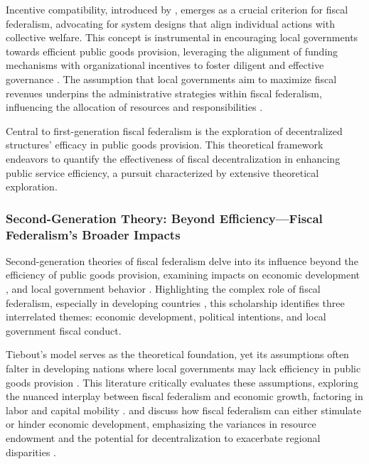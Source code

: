 Incentive compatibility, introduced by \textcite{hurwicz1973design}, emerges as a crucial criterion for fiscal federalism, advocating for system designs that align individual actions with collective welfare. This concept is instrumental in encouraging local governments towards efficient public goods provision, leveraging the alignment of funding mechanisms with organizational incentives to foster diligent and effective governance \parencite{eckstein1958water}. The assumption that local governments aim to maximize fiscal revenues underpins the administrative strategies within fiscal federalism, influencing the allocation of resources and responsibilities \parencite{baretti2002tax,bucovetsky2006efficiency,dahlby2011marginal,jha2000tax}.

Central to first-generation fiscal federalism is the exploration of decentralized structures' efficacy in public goods provision. This theoretical framework endeavors to quantify the effectiveness of fiscal decentralization in enhancing public service efficiency, a pursuit characterized by extensive theoretical exploration.

\subsubsection{Second-Generation Theory: Beyond Efficiency---Fiscal Federalism's Broader Impacts}

Second-generation theories of fiscal federalism delve into its influence beyond the efficiency of public goods provision, examining impacts on economic development \parencite{cai2005does,barro1991economic}, and local government behavior \parencite{jin2005regional}. Highlighting the complex role of fiscal federalism, especially in developing countries \parencite{keen1997fiscal,treisman2002decentralization,bardhan2002decentralization,bucovetsky2005public}, this scholarship identifies three interrelated themes: economic development, political intentions, and local government fiscal conduct.

Tiebout's model serves as the theoretical foundation, yet its assumptions often falter in developing nations where local governments may lack efficiency in public goods provision \parencite{tiebout1956pure}. This literature critically evaluates these assumptions, exploring the nuanced interplay between fiscal federalism and economic growth, factoring in labor and capital mobility \parencite{oates2004essay}. \textcite{faguet2004does} and \textcite{mckinnon1993order} discuss how fiscal federalism can either stimulate or hinder economic development, emphasizing the variances in resource endowment and the potential for decentralization to exacerbate regional disparities \parencite{cai2005does,treisman2002decentralization}.

